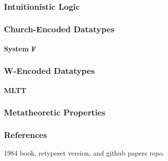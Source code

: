 \documentclass[mathserif]{beamer}
\begin{document}
\begin{frame}
\frametitle{Intuitionistic Logic}


\end{frame}


\begin{frame}
\frametitle{Church-Encoded Datatypes}
\framesubtitle{System F}

\end{frame}

\begin{frame}
\frametitle{W-Encoded Datatypes}
\framesubtitle{MLTT}

\end{frame}


\begin{frame}
\frametitle{Metatheoretic Properties}

\end{frame}

\begin{frame}
\frametitle{References}

1984 book, retypeset version,
and github papers repo.

\end{frame}
\end{document}
